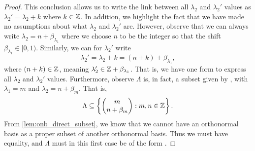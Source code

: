 \documentclass[../thesis.tex]{subfiles}
\begin{document}
\begin{proof}
    This conclusion allows us to write the link between all $\lambda_2$ and $\lambda_2'$ values as $\lambda_2' = \lambda_2 + k$ where $k\in \mathbb{Z}$. In addition, we highlight the fact that we have made no assumptions about what $\lambda_2$ and $\lambda_2'$ are. However, observe that we can always write $\lambda_2 = n+\beta_{\lambda_1}$ where we choose $n$ to be the integer so that the shift $\beta_{\lambda_1}\in [0,1)$. Similarly, we can for $\lambda_2'$ write
    \begin{equation*}
        \lambda_2' = \lambda_2 + k = (n+k) +  \beta_{\lambda_1},
    \end{equation*}
    where $(n+k)\in \mathbb{Z}$, meaning $\lambda_2' \in \mathbb{Z} + \beta_{\lambda_1}$. That is, we have one form to express all $\lambda_2$ and $\lambda_2'$ values. %
    Furthermore, observe $\Lambda$ is, in fact, a subset given by , with $\lambda_1 = m$ and $\lambda_2 = n+\beta_m$. That is,
    \begin{equation*}  %
        \Lambda \subseteq \braqMed{\begin{pmatrix} m \\ n+\beta_m\end{pmatrix} : m,n \in \Z}.
    \end{equation*} %
    From \cref{lem:onb_direct_subset}, we know that we cannot have an orthonormal basis as a proper subset of another orthonormal basis. Thus we must have equality, and $\Lambda$ must in this first case be of the form .


\end{proof}
\end{document}
